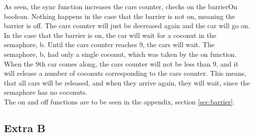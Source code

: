 As seen, the sync function increases the cars counter, checks on the barrierOn boolean. Nothing happens in the case that the barrier is not on, meaning the barrier is off. The cars counter will just be decreased again and the car will go on. \\
In the case that the barrier is on, the car will wait for a coconut in the semaphore, b. Until the cars counter reaches 9, the cars will wait. The semaphore, b, had only a single coconut, which was taken by the on function. When the 9th car comes along, the cars counter will not be less than 9, and it will release a number of coconuts corresponding to the cars counter. This means, that all cars will be released, and when they arrive again, they will wait, since the semaphore has no coconuts. \\
The on and off functions are to be seen in the appendix, section \ref{sec:barrier}.

\subsection{Extra B}
